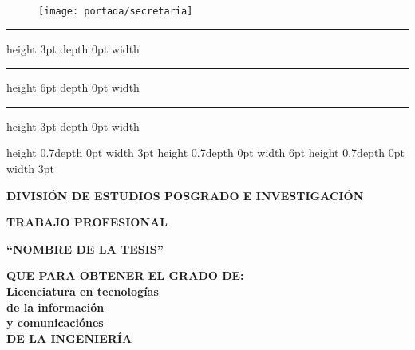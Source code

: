 \begin{titlepage}
    \vspace*{-2cm}
    \begin{figure}[H]
        \texttt{[image: portada/secretaria]}
    \end{figure}

    \hrule height 3pt depth 0pt width \textwidth
    \vspace{2pt}
    \hrule height 6pt depth 0pt width \textwidth
    \vspace{2pt}
    \hrule height 3pt depth 0pt width \textwidth

    \hspace{12pt}
    \vrule height 0.7\textheight depth 0pt width 3pt
    \hspace{-1pt}
    \vrule height 0.7\textheight depth 0pt width 6pt
    \hspace{-1pt}
    \vrule height 0.7\textheight depth 0pt width 3pt

    \vspace*{-165mm}

    \begin{center}
        \textbf{DIVISIÓN DE ESTUDIOS POSGRADO E INVESTIGACIÓN}
    \end{center}

    \vspace{0.2\baselineskip}
    \begin{center}
        \fontsize{12}{12}\selectfont \textbf{TRABAJO PROFESIONAL}
    \end{center}

    \vspace{0.5\baselineskip}
    \begin{center}
        \textbf{``NOMBRE DE LA TESIS''} %
    \end{center}

    \vspace{0.5\baselineskip}
    \begin{center}
        \fontsize{11}{12}\selectfont \textbf{QUE PARA OBTENER EL GRADO DE:} \\
        \fontsize{12}{12}\selectfont \textbf{Licenciatura en tecnologías} \\
        \fontsize{12}{12}\selectfont \textbf{de la información} \\
        \fontsize{12}{12}\selectfont \textbf{y comunicaciónes} \\
        \fontsize{12}{12}\selectfont \textbf{DE LA INGENIERÍA}
    \end{center}


\end{titlepage}
